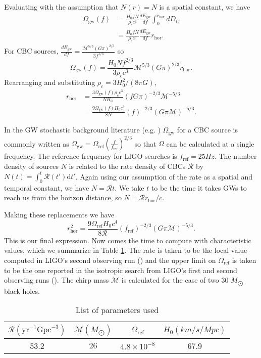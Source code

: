 \documentclass[]{article}
\newcommand{\Ogw}{\Omega_{\mathrm{gw}}}
\newcommand{\rhor}{r_{\text{hor}}}
\begin{document}
Evaluating with the assumption that $N(r) = N$ is a spatial constant, we have
\begin{align*}
	\Ogw(f) &= \frac{H_0 f N}{\rho_c c^3} \frac{dE_{\mathrm{gw}}}{df} \int_{0}^{r_{\text{hor}}} dD_C \\
	&= \frac{H_0 f N}{\rho_c c^3} \frac{dE_{\mathrm{gw}}}{df} r_{\text{hor}} .
\end{align*}
For CBC sources, $\frac{dE_{\mathrm{gw}}}{df} = \frac{\mathcal{M}^{5/3}(G\pi)^{2/3}}{3 f^{1/3}}$ so
\begin{equation*}
	\Ogw(f) = \frac{H_0 N f^{2/3}}{3 \rho_c c^3} \mathcal{M}^{5/3}(G\pi)^{2/3} r_{\text{hor}} .
\end{equation*}
Rearranging and substituting $\rho_c = 3 H_0^2/(8\pi G)$,
\begin{align*}
	r_{\text{hor}} &= \frac{3\Ogw(f)\rho_c c^3}{N H_0} (f G \pi)^{-2/3} \mathcal{M}^{-5/3} \\
	&=\frac{9\Ogw(f) H_0 c^3}{8 N} (f)^{-2/3} ( G \pi \mathcal{M})^{-5/3} .
\end{align*}

In the GW stochastic background literature (e.g. \cite{O1_stoch,O2_stoch}) $\Ogw$ for a CBC source is commonly written as $\Ogw = \Omega_{\text{ref}} (\frac{f}{f_{\text{ref}}})^{2/3}$ so that $\Omega$ can be calculated at a single frequency. 
The reference frequency for LIGO searches is $f_{\text{ref}} = 25 Hz$.  
The number density of sources $N$ is related to the rate density of CBCs $\mathcal{R}$ by $N(t) = \int_{0}^{t}\mathcal{R}(t') \text{d}t'$.
Again using our assumption of the rate as a spatial and temporal constant, we have $N = \mathcal{R} t$. 
We take $t$ to be the time it takes GWs to reach us from the horizon distance, so $N = \mathcal{R} r_{\text{hor}}/c$. 

Making these replacements we have
\begin{equation}
	\rhor^2=\frac{9\Omega_{\text{ref}} H_0 c^4}{8 \mathcal{R}} (f_{\text{ref}})^{-2/3} ( G \pi \mathcal{M})^{-5/3} .
	\label{eq:final_expression}
\end{equation}
This is our final expression.
Now comes the time to compute with characteristic values, which we summarize in Table \ref{tab:vals}. 
The rate is taken to be the local value computed in LIGO's second observing run (\cite{O2_rates}) and the upper limit on $\Omega_{\text{ref}}$ is taken to be the one reported in the isotropic search from LIGO's first and second observing runs (\cite{O2_stoch}).
The chirp mass $\mathcal{M}$ is calculated for the case of two 30 $M_{\bigodot}$ black holes.
\begin{table}
	\centering
\begin{tabular}{c|c|c|c}
	$\mathcal{R} (\mathrm{yr}^{-1} \mathrm{Gpc}^{-3})$ & $\mathcal{M} (M_{\bigodot})$  & $\Omega_{\text{ref}} $ & $H_0 (km/s/Mpc)$ \\
	\hline
	 53.2 & $26$ & $4.8\times10^{-8}$ & 67.9 \\
\end{tabular} 
\caption{List of parameters used}
\label{tab:vals}
\end{table}
\end{document}
